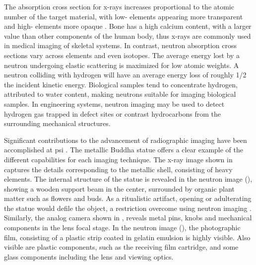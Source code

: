 \documentclass[../../../main.tex]{subfiles}
\begin{document}
    The absorption cross section for \glspl{x-ray} increases proportional to the atomic number  of the target material, with low- elements appearing more transparent and high- elements more opaque \cite{book:Banhart_2008}.
    Bone has a high calcium content, with a larger  value than other components of the human body, thus \glspl{x-ray} are commonly used in medical imaging of skeletal systems.
    In contrast, neutron absorption cross sections vary across elements and even isotopes.
    The average energy lost by a neutron undergoing elastic scattering is maximized for low atomic weights.
    A neutron colliding with hydrogen will have an average energy loss of roughly 1/2 the incident kinetic energy.
    Biological samples tend to concentrate hydrogen, attributed to water content, making neutrons suitable for imaging biological samples.
    In engineering systems, neutron imaging may be used to detect hydrogen gas trapped in defect sites or contrast hydrocarbons from the surrounding mechanical structures.
    \par%
    Significant contributions to the advancement of radiographic imaging have been accomplished at \gls{psi} \cite{website:Paul_Scherrer_Institute}.
    The metallic Buddha statue offers a clear example of the different capabilities for each imaging technique.
    The \gls{x-ray} image shown in  captures the details corresponding to the metallic shell, consisting of heavy elements.
    The internal structure of the statue is revealed in the neutron image (), showing a wooden support beam in the center, surrounded by organic plant matter such as flowers and buds.
    As a ritualistic artifact, opening or adulterating the statue would defile the object, a restriction overcome using neutron imaging \cite{Lehmann_2010}.
    Similarly, the analog camera shown in , reveals metal pins, knobs and mechanical components in the lens focal stage.
    In the neutron image (), the photographic film, consisting of a plastic strip coated in gelatin emulsion is highly visible.
    Also visible are plastic components, such as the receiving film cartridge, and some glass components including the lens and viewing optics. 
\end{document}
